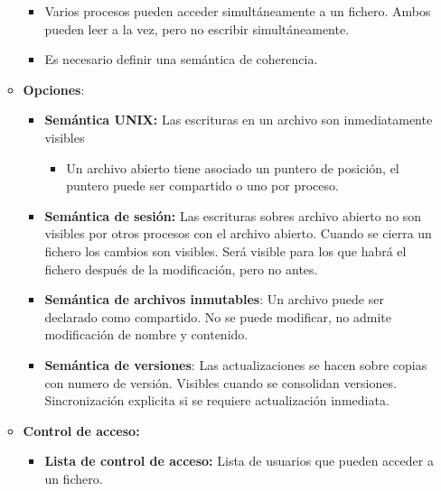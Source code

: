 \documentclass[12pt, twoside, openright]{report} %
\begin{document}
\begin{itemize}
\begin{itemize}
      \begin{itemize}
      \item Varios procesos pueden acceder simultáneamente a un fichero.
        Ambos pueden leer a la vez, pero no escribir simultáneamente.
        
      \item Es necesario definir una semántica de coherencia.
        
      \end{itemize}
    \item \textbf{Opciones}:
      

      \begin{itemize}
      \item \textbf{Semántica UNIX:} Las escrituras en un archivo son
        inmediatamente visibles
        

        \begin{itemize}
        \item Un archivo abierto tiene asociado un puntero de posición, el
          puntero puede ser compartido o uno por proceso.
          
        \end{itemize}
      \item \textbf{Semántica de sesión:} Las escrituras sobres archivo
        abierto no son visibles por otros procesos con el archivo
        abierto. Cuando se cierra un fichero los cambios son visibles.
        Será visible para los que habrá el fichero después de la
        modificación, pero no antes.
        
      \item \textbf{Semántica de archivos inmutables}: Un archivo puede ser
        declarado como compartido. No se puede modificar, no admite
        modificación de nombre y contenido.
        
      \item \textbf{Semántica de versiones}: Las actualizaciones se hacen
        sobre copias con numero de versión. Visibles cuando se
        consolidan versiones. Sincronización explicita si se requiere
        actualización inmediata.
        
      \end{itemize}
    \item \textbf{Control de acceso:}
      

      \begin{itemize}
      \item \textbf{Lista de control de acceso:} Lista de usuarios que
        pueden acceder a un fichero.
        


\end{itemize}
\end{itemize}
\end{itemize}
\end{document}

